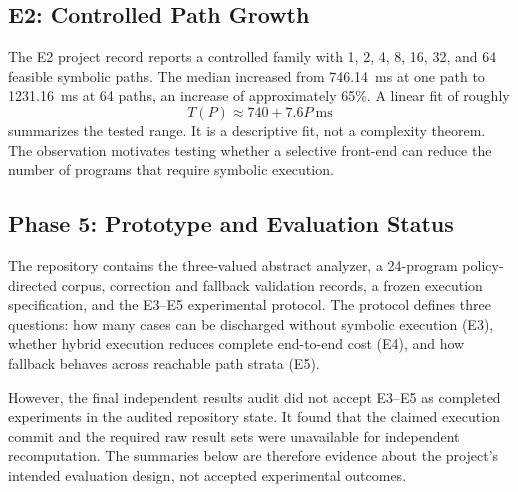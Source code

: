 \documentclass[12pt,a4paper]{article}
\begin{document}
\subsection{E2: Controlled Path Growth}

The E2 project record reports a controlled family with 1, 2, 4, 8, 16, 32, and 64 feasible symbolic paths. The median increased from 746.14~ms at one path to 1231.16~ms at 64 paths, an increase of approximately 65\%. A linear fit of roughly
\[
T(P)\approx 740+7.6P\ \mathrm{ms}
\]
summarizes the tested range. It is a descriptive fit, not a complexity theorem. The observation motivates testing whether a selective front-end can reduce the number of programs that require symbolic execution.

\subsection{Phase 5: Prototype and Evaluation Status}

The repository contains the three-valued abstract analyzer, a 24-program policy-directed corpus, correction and fallback validation records, a frozen execution specification, and the E3--E5 experimental protocol. The protocol defines three questions: how many cases can be discharged without symbolic execution (E3), whether hybrid execution reduces complete end-to-end cost (E4), and how fallback behaves across reachable path strata (E5).

However, the final independent results audit did not accept E3--E5 as completed experiments in the audited repository state. It found that the claimed execution commit and the required raw result sets were unavailable for independent recomputation. The summaries below are therefore evidence about the project's intended evaluation design, not accepted experimental outcomes.
\end{document}
